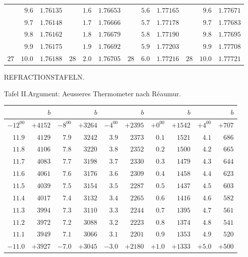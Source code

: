 \begin{center}
{\begin{tabular}{rr|r||rr|r||rr|r||rr|r}
 & $9.6$ & $1.76135$ &  & $1.6$ & $1.76653$ &  & $5.6$ & $1.77165$ &  & $9.6$ & $1.77671$\\
 & $9.7$ & $1.76148$ &  & $1.7$ & $1.76666$ &  & $5.7$ & $1.77178$ &  & $9.7$ & $1.77683$\\
 & $9.8$ & $1.76162$ &  & $1.8$ & $1.76679$ &  & $5.8$ & $1.77190$ &  & $9.8$ & $1.77695$\\
 & $9.9$ & $1.76175$ &  & $1.9$ & $1.76692$ &  & $5.9$ & $1.77203$ &  & $9.9$ & $1.77708$\\[4pt]
$27$ & $10.0$ & $1.76188$ & $28$ & $2.0$ & $1.76705$ & $28$ & $6.0$ & $1.77216$ & $28$ & $10.0$ & $1.77721$
\end{tabular}}
\end{center}
\clearpage{}%
\begin{center}
{\small REFRACTIONSTAFELN.\par}
\medskip
Tafel II.\quad Argument: Aeusseres Thermometer nach Réaumur.
\medskip
{\fontsize{9}{10.2}\selectfont\setlength{\tabcolsep}{4pt}
\begin{tabular}{r|r||r|r||r|r||r|r||r|r}
&$b$&&$b$&&$b$&&$b$&&$b$\\\hline
$-12^00$ & $+4152$ & $-8^00$ & $+3264$ & $-4^00$ & $+2395$ & $+0^00$ & $+1542$ & $+4^00$ & $+707$\\
$11.9$ & $4129$ & $7.9$ & $3242$ & $3.9$ & $2373$ & $0.1$ & $1521$ & $4.1$ & $686$\\
$11.8$ & $4106$ & $7.8$ & $3220$ & $3.8$ & $2352$ & $0.2$ & $1500$ & $4.2$ & $665$\\
$11.7$ & $4083$ & $7.7$ & $3198$ & $3.7$ & $2330$ & $0.3$ & $1479$ & $4.3$ & $644$\\
$11.6$ & $4061$ & $7.6$ & $3176$ & $3.6$ & $2309$ & $0.4$ & $1458$ & $4.4$ & $623$\\
$11.5$ & $4039$ & $7.5$ & $3154$ & $3.5$ & $2287$ & $0.5$ & $1437$ & $4.5$ & $603$\\
$11.4$ & $4017$ & $7.4$ & $3132$ & $3.4$ & $2265$ & $0.6$ & $1416$ & $4.6$ & $582$\\
$11.3$ & $3994$ & $7.3$ & $3110$ & $3.3$ & $2244$ & $0.7$ & $1395$ & $4.7$ & $561$\\
$11.2$ & $3972$ & $7.2$ & $3088$ & $3.2$ & $2223$ & $0.8$ & $1374$ & $4.8$ & $541$\\
$11.1$ & $3949$ & $7.1$ & $3066$ & $3.1$ & $2201$ & $0.9$ & $1353$ & $4.9$ & $520$\\[4pt]
$-11.0$ & $+3927$ & $-7.0$ & $+3045$ & $-3.0$ & $+2180$ & $+1.0$ & $+1333$ & $+5.0$ & $+500$\\

\end{tabular}}
\end{center}
